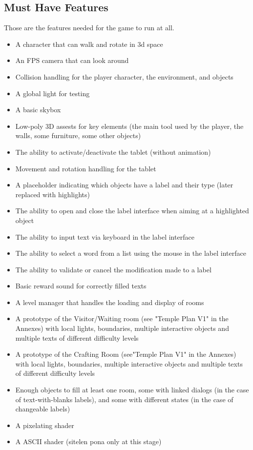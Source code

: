 \documentclass{scrartcl}
\begin{document}
		\subsection{Must Have Features}
			Those are the features needed for the game to run at all.
			\begin{itemize}
				\item A character that can walk and rotate in 3d space
				\item An FPS camera that can look around
				\item Collision handling for the player character, the environment, and objects
				\item A global light for testing
				\item A basic skybox
				\item Low-poly 3D assests for key elements (the main tool used by the player, the walls, some furniture, some other objects)
				\item The ability to activate/deactivate the tablet (without animation)
				\item Movement and rotation handling for the tablet
				\item A placeholder indicating which objects have a label and their type (later replaced with highlights)
				\item The ability to open and close the label interface when aiming at a highlighted object
				\item The ability to input text via keyboard in the label interface
				\item The ability to select a word from a list using the mouse in the label interface
				\item The ability to validate or cancel the modification made to a label
				\item Basic reward sound for correctly filled texts
				\item A level manager that handles the loading and display of rooms
				\item A prototype of the Visitor/Waiting room (see "Temple Plan V1" in the Annexes) with local lights, boundaries, multiple interactive objects and multiple texts of different difficulty levels
				\item A prototype of the Crafting Room (see"Temple Plan V1" in the Annexes) with local lights, boundaries, multiple interactive objects and multiple texts of different difficulty levels
				\item Enough objects to fill at least one room, some with linked dialogs (in the case of text-with-blanks labels), and some with different states (in the case of changeable labels)
				\item A pixelating shader
				\item A ASCII shader (sitelen pona only at this stage)
			\end{itemize}
\end{document}
